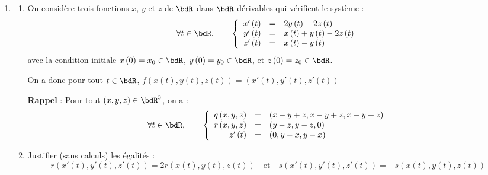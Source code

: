 \documentclass[a4paper,french,bookmarks]{article}
\begin{document}
\begin{enumerate}[resume]
    \item \begin{enumerate}
        \item[] On considère trois fonctions $x$, $y$ et $z$ de $\bdR$
        dans $\bdR$ dérivables qui vérifient le système :
        \begin{equation}
            \forall t \in \bdR,\qquad \left\lbrace\begin{array}{rcl}
                x'\left(t\right) &=& 2y\left(t\right) -
                2z\left(t\right)\\
                y'\left(t\right) &=& x\left(t\right) + y\left(t\right) -
                2z\left(t\right)\\
                z'\left(t\right) &=& x\left(t\right) - y\left(t\right)
            \end{array}\right.
        \end{equation}
        avec la condition initiale $x\left(0\right) = x_0 \in \bdR$,
        $y\left(0\right) = y_0 \in \bdR$, et $z\left(0\right) = z_0 \in
        \bdR$.
        
        On a donc pour tout $t \in \bdR$, $f\left(x\left(t\right),
        y\left(t\right), z\left(t\right)\right) =
        \left(x'\left(t\right), y'\left(t\right),
        z'\left(t\right)\right)$
    
        \textbf{Rappel} : Pour tout $\left(x, y, z\right) \in \bdR^3$,
        on a :
        \begin{equation}
            \forall t \in \bdR,\qquad \left\lbrace\begin{array}{rcl}
                q\left(x, y, z\right) &=& \left(x - y + z, x - y + z, x
                - y + z\right)\\
                r\left(x, y, z\right) &=& \left(y - z, y - z, 0\right)\\
                z'\left(t\right) &=& \left(0, y - x, y - x\right)
            \end{array}\right.
        \end{equation}
        
        \item Justifier (sans calculs) les égalités :
        \begin{equation}
            r\left(x'\left(t\right), y'\left(t\right),
            z'\left(t\right)\right) = 2r\left(x\left(t\right),
            y\left(t\right), z\left(t\right)\right) \quad\text{et}\quad
            s\left(x'\left(t\right), y'\left(t\right),
            z'\left(t\right)\right) = -s\left(x\left(t\right),
            y\left(t\right), z\left(t\right)\right)
        \end{equation}
        

\end{enumerate}
\end{enumerate}
\end{document}
